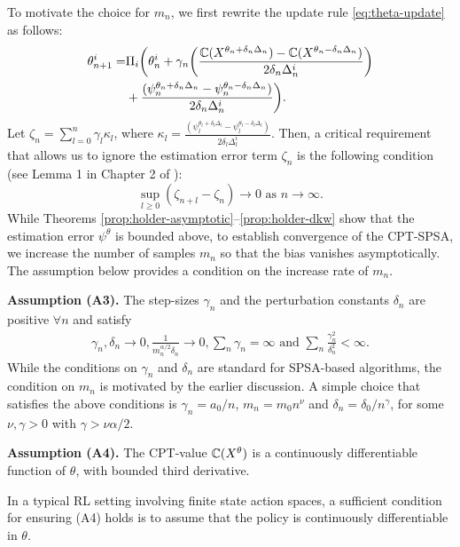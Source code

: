 To motivate the choice for $m_n$, we first rewrite the update rule \eqref{eq:theta-update} as follows:
\begin{align*}
\theta^{i}_{n+1}  = & \Pi_{i}\bigg( \theta^{i}_n +  \gamma_n \bigg( \frac{\mathbb{C}(X^{\theta_n +\delta_n\Delta_n}) - \mathbb{C}(X^{\theta_n-\delta_n\Delta_n})}{2\delta_n\Delta_n^{i}}\bigg) \\
&+ \frac{(\psi_n^{\theta_n +\delta_n\Delta_n} - \psi_n^{\theta_n-\delta_n\Delta_n})}{2\delta_n\Delta_n^{i}}\bigg).
\end{align*}
Let $\zeta_n = \sum_{l = 0}^{n} \gamma_l \kappa_{l}$, where $\kappa_l = \frac{(\psi_l^{\theta_l +\delta_l\Delta_l} - \psi_l^{\theta_l-\delta_l\Delta_l})}{2\delta_l\Delta_l^{i}}$. Then, a critical requirement that allows us to ignore the estimation error term $\zeta_n$ is the following condition (see Lemma 1 in Chapter 2 of \cite{borkar2008stochastic}): 
$$\sup_{l\ge0} \left (\zeta_{n+l} - \zeta_n \right) \rightarrow 0 \text{ as } n\rightarrow\infty.$$ 
While Theorems \ref{prop:holder-asymptotic}--\ref{prop:holder-dkw} show that the estimation error $\psi^\theta$ is bounded above, to establish convergence of the CPT-SPSA, we increase the number of samples $m_n$ so that the bias vanishes asymptotically.  The assumption below provides a condition on the increase rate of $m_n$.

\noindent\textbf{Assumption (A3).}  The step-sizes $\gamma_n$ and the perturbation constants 
$\delta_n$ are positive $\forall n$ and satisfy
\begin{align*}
\gamma_n, \delta_n \rightarrow 0, \frac{1}{m_n^{\alpha/2}\delta_n}\rightarrow 0,  \sum_n \gamma_n=\infty \text{ and } \sum_n \frac{\gamma_n^2}{\delta_n^2}<\infty. 
\end{align*}
While the conditions on $\gamma_n$ and $\delta_n$ are standard for SPSA-based algorithms, the condition on $m_n$ is motivated by the earlier discussion. 
A simple choice that satisfies the above conditions is $\gamma_n = a_0/n$, $m_n = m_0 n^\nu$ and $\delta_n = \delta_0/{n^\gamma}$, for some $\nu, \gamma >0$ with $\gamma > \nu\alpha/2$.

\noindent\textbf{Assumption (A4).}  The CPT-value $\mathbb{C}(X^\theta)$ is a continuously differentiable function of $\theta$, with bounded third derivative.

In a typical RL setting involving finite state action spaces, a sufficient condition for ensuring (A4) holds is to assume that the policy is continuously differentiable in $\theta$. 

